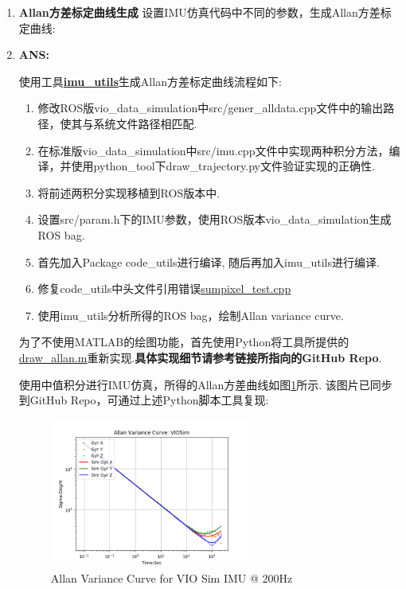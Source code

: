 \documentclass[a4paper]{article}
\begin{document}
\begin{enumerate} %
    \item[1.] {\bf Allan方差标定曲线生成}
    设置IMU仿真代码中不同的参数，生成Allan方差标定曲线:

    \item[$\ast$]{\bf ANS:}
    
    使用工具\textbf{\href{https://github.com/gaowenliang/imu\_utils}{imu\_utils}}生成Allan方差标定曲线流程如下:
    \begin{enumerate}
        \item 修改ROS版vio\_data\_simulation中src/gener\_alldata.cpp文件中的输出路径，使其与系统文件路径相匹配.
        \item 在标准版vio\_data\_simulation中src/imu.cpp文件中实现两种积分方法，编译，并使用python\_tool下draw\_trajectory.py文件验证实现的正确性.
        \item 将前述两积分实现移植到ROS版本中.
        \item 设置src/param.h下的IMU参数，使用ROS版本vio\_data\_simulation生成ROS bag.
        \item 首先加入Package code\_utils进行编译, 随后再加入imu\_utils进行编译.
        \item 修复code\_utils中头文件引用错误\href{https://github.com/AlexGeControl/Auto-Car-03-SLAM-00-Algorithms/blob/master/08-imu/ros/code_utils/src/sumpixel_test.cpp}{sumpixel\_test.cpp}
        \item 使用imu\_utils分析所得的ROS bag，绘制Allan variance curve.
    \end{enumerate}    

    为了不使用MATLAB的绘图功能，首先使用Python将工具所提供的\href{https://github.com/AlexGeControl/Auto-Car-03-SLAM-00-Algorithms/blob/master/08-imu/ros/imu_utils/scripts/draw_allan.py}{draw\_allan.m}重新实现.\textbf{具体实现细节请参考链接所指向的GitHub Repo}.
    
    使用中值积分进行IMU仿真，所得的Allan方差曲线如图\ref{fig:allan}所示. 该图片已同步到GitHub Repo，可通过上述Python脚本工具复现:
    \begin{figure}[h]
        \centering
        \includegraphics[width=0.618\textwidth]{viosim-allan-variance-curve}
        \caption{Allan Variance Curve for VIO Sim IMU @ 200Hz}
        \label{fig:allan}
    \end{figure}
    

\end{enumerate}
\end{document}
